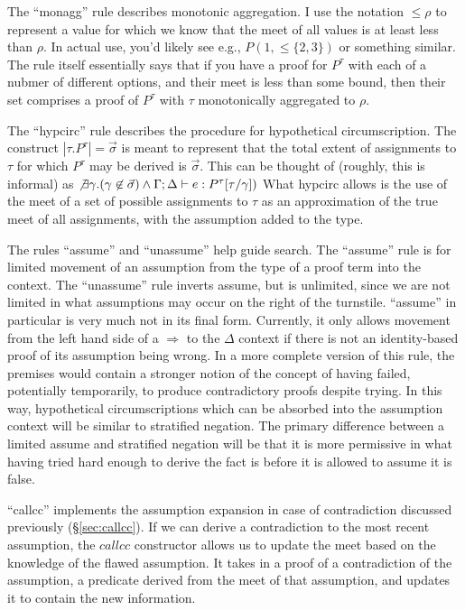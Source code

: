 The ``monagg'' rule describes monotonic aggregation.
I use the notation $\leq \rho$ to represent a value for which we know that the meet of all values is at least less than $\rho$.
In actual use, you'd likely see e.g., $P(1, \leq \{2, 3\})$ or something similar.
The rule itself essentially says that if you have a proof for $P^\tau$ with each of a nubmer of different options, and their meet is less than some bound, then their set comprises a proof of $P^\tau$ with $\tau$ monotonically aggregated to $\rho$.

The ``hypcirc'' rule describes the procedure for hypothetical circumscription.
The construct $|\tau.P^\tau| = \vec{\sigma}$ is meant to represent that the total extent of assignments to $\tau$ for which $P^\tau$ may be derived is $\vec{\sigma}$.
This can be thought of (roughly, this is informal) as $\not \exists \gamma. (\gamma \not \in \vec{\sigma}) \wedge \Gamma; \Delta \vdash e : P^\tau[\tau/\gamma])$
What hypcirc allows is the use of the meet of a set of possible assignments to $\tau$ as an approximation of the true meet of all assignments, with the assumption added to the type.

The rules ``assume'' and ``unassume'' help guide search.
The ``assume'' rule is for limited movement of an assumption from the type of a proof term into the context.
The ``unassume'' rule inverts assume, but is unlimited, since we are not limited in what assumptions may occur on the right of the turnstile.
``assume'' in particular is very much not in its final form.
Currently, it only allows movement from the left hand side of a $\Rightarrow$ to the $\Delta$ context if there is not an identity-based proof of its assumption being wrong.
In a more complete version of this rule, the premises would contain a stronger notion of the concept of having failed, potentially temporarily, to produce contradictory proofs despite trying.
In this way, hypothetical circumscriptions which can be absorbed into the assumption context will be similar to stratified negation.
The primary difference between a limited assume and stratified negation will be that it is more permissive in what having tried hard enough to derive the fact is before it is allowed to assume it is false.

``callcc'' implements the assumption expansion in case of contradiction discussed previously (\S \ref{sec:callcc}).
If we can derive a contradiction to the most recent assumption, the $callcc$ constructor allows us to update the meet based on the knowledge of the flawed assumption.
It takes in a proof of a contradiction of the assumption, a predicate derived from the meet of that assumption, and updates it to contain the new information.

